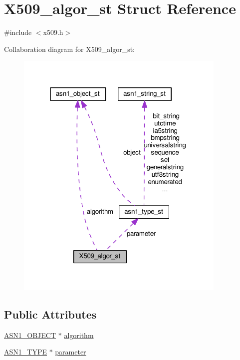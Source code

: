\hypertarget{struct_x509__algor__st}{}\section{X509\+\_\+algor\+\_\+st Struct Reference}
\label{struct_x509__algor__st}


{\ttfamily \#include $<$x509.\+h$>$}



Collaboration diagram for X509\+\_\+algor\+\_\+st\+:
\nopagebreak
\begin{figure}[H]
\begin{center}
\leavevmode
\includegraphics[width=285pt]{struct_x509__algor__st__coll__graph}
\end{center}
\end{figure}
\subsection*{Public Attributes}
\begin{DoxyCompactItemize}
\item 
\hyperlink{asn1_8h_ae10c08e4e6b23f67a39b2add932ec48f}{A\+S\+N1\+\_\+\+O\+B\+J\+E\+CT} $\ast$ \hyperlink{struct_x509__algor__st_a79eaee9147e50e87d311ccd20f781960}{algorithm}
\item 
\hyperlink{asn1_8h_a7895e03d9fee2bc4963faf2a31a9439e}{A\+S\+N1\+\_\+\+T\+Y\+PE} $\ast$ \hyperlink{struct_x509__algor__st_a0c0f294d859665c5b1e6d86c695ac4e1}{parameter}
\end{DoxyCompactItemize}


